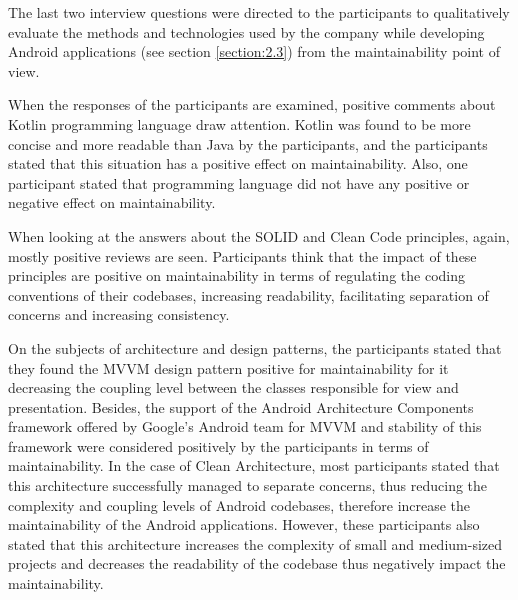 The last two interview questions were directed to the participants to qualitatively evaluate the methods and technologies used by the company while developing Android applications  (see section \ref{section:2.3}) from the maintainability point  of view. 

When the responses of the participants are examined, positive comments about Kotlin programming language draw attention. Kotlin was found to be more concise and more readable than Java by the participants, and the participants stated that this situation has a positive effect on maintainability. Also, one participant stated that programming language did not have any positive or negative effect on maintainability. 

When looking at the answers about the SOLID and Clean Code principles, again, mostly positive reviews are seen. Participants think that the impact of these principles are positive on maintainability in terms of regulating the coding conventions of their codebases, increasing readability, facilitating separation of concerns and increasing consistency. 

On the subjects of architecture and design patterns, the participants stated that they found the MVVM design pattern positive for maintainability for it decreasing the coupling level between the classes responsible for view and presentation. Besides, the support of the Android Architecture Components framework offered by Google's Android team for MVVM and stability of this framework were considered positively by the participants in terms of maintainability. In the case of Clean Architecture, most participants stated that this architecture successfully managed to separate concerns, thus reducing the complexity and coupling levels of Android codebases, therefore increase the maintainability of the Android applications. However, these participants also stated that this architecture increases the complexity of small and medium-sized projects and decreases the readability of the codebase thus negatively impact the maintainability. 

